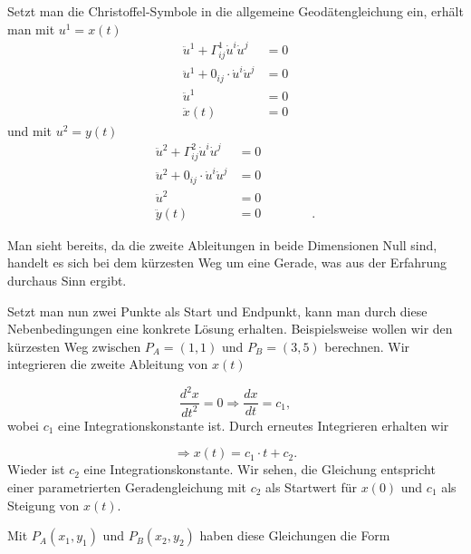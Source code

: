 Setzt man die Christoffel-Symbole in die allgemeine Geodätengleichung ein, erhält man mit $u^1 = x(t)$
\begin{equation}
\begin{aligned}
\ddot{u}^1 + \Gamma_{ij}^1 \dot{u}^i \dot{u}^j &= 0 \\
\ddot{u}^1 + 0_{ij} \cdot \dot{u}^i \dot{u}^j &= 0\\
\ddot{u}^1 &= 0 \\
\ddot{x}(t) &= 0
\end{aligned}
\label{geodaeten:equation:Standardverfahren:Kartesisch:x}
\end{equation}
und mit $u^2 = y(t)$
\begin{equation}
\begin{aligned}
\ddot{u}^2 + \Gamma_{ij}^2 \dot{u}^i \dot{u}^j &= 0 \\
\ddot{u}^2 + 0_{ij} \cdot \dot{u}^i \dot{u}^j &= 0 \\
\ddot{u}^2 &= 0 \\
\ddot{y}(t) &= 0 \qquad \qquad .
\end{aligned}
\label{geodaeten:equation:Standardverfahren:Kartesisch:y}
\end{equation}

Man sieht bereits, da die zweite Ableitungen in beide Dimensionen Null sind, handelt es sich bei dem kürzesten Weg um eine Gerade, was aus der Erfahrung durchaus Sinn ergibt.

Setzt man nun zwei Punkte als Start und Endpunkt, kann man durch diese Nebenbedingungen eine konkrete Lösung erhalten.
Beispielsweise wollen wir den kürzesten Weg zwischen $P_A = (1,1)$ und $P_B = (3,5)$ berechnen. Wir integrieren die zweite Ableitung von $x(t)$

\begin{equation}
	\frac{d^2x}{dt^2} = 0 \Rightarrow \frac{dx}{dt} = c_1 ,
\end{equation}
wobei $c_1$ eine Integrationskonstante ist. Durch erneutes Integrieren erhalten wir

\begin{equation}
\Rightarrow x(t) = c_1 \cdot t + c_2  .
\label{geodaeten:equation:Standardverfahren:Kartesisch:equation1}
\end{equation}
Wieder ist $c_2$ eine Integrationskonstante. 
Wir sehen, die Gleichung entspricht einer parametrierten Geradengleichung mit $c_2$ als Startwert für $x(0)$ und $c_1$ als Steigung von $x(t)$. 

Mit $P_A(x_1,y_1)$ und $P_B(x_2,y_2)$ haben diese Gleichungen die Form

